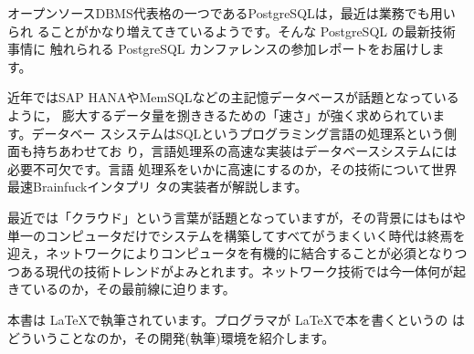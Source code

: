 オープンソースDBMS代表格の一つであるPostgreSQLは，最近は業務でも用いられ
ることがかなり増えてきているようです。そんな PostgreSQL の最新技術事情に
触れられる PostgreSQL カンファレンスの参加レポートをお届けします。

\vspace*{\Cvs}


近年ではSAP HANAやMemSQLなどの主記憶データベースが話題となっているように，
膨大するデータ量を捌ききるための「速さ」が強く求められています。データベー
スシステムはSQLというプログラミング言語の処理系という側面も持ちあわせてお
り，言語処理系の高速な実装はデータベースシステムには必要不可欠です。言語
処理系をいかに高速にするのか，その技術について世界最速Brainfuckインタプリ
タの実装者が解説します。

\vspace*{\Cvs}



最近では「クラウド」という言葉が話題となっていますが，その背景にはもはや
単一のコンピュータだけでシステムを構築してすべてがうまくいく時代は終焉を
迎え，ネットワークによりコンピュータを有機的に結合することが必須となりつ
つある現代の技術トレンドがよみとれます。ネットワーク技術では今一体何が起
きているのか，その最前線に迫ります。

\vspace*{\Cvs}


本書は \LaTeX で執筆されています。プログラマが \LaTeX で本を書くというの
はどういうことなのか，その開発(執筆)環境を紹介します。


\thispagestyle{plainhead}
